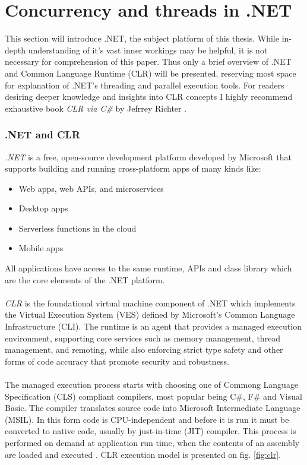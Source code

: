 \clearpage
\section{Concurrency and threads in .NET}
This section will introduce .NET, the subject platform of this thesis. While in-depth understanding of it's vast inner workings may be helpful, it is not necessary for comprehension of this paper. Thus only a brief overview of .NET and Common Language Runtime (CLR) will be presented, reserving most space for explanation of .NET's threading and parallel execution tools. For readers desiring deeper knowledge and insights into CLR concepts I highly recommend exhaustive book \emph{CLR via C\#} by Jefrrey Richter \cite{richter}.

\subsubsection{.NET and CLR}
\emph{.NET} is a free, open-source development platform developed by Microsoft that supports building and running cross-platform apps of many kinds like:
\begin{itemize}
	\item Web apps, web APIs, and microservices
	\item Desktop apps
	\item Serverless functions in the cloud
	\item Mobile apps
\end{itemize}

All applications have access to the same runtime, APIs and class library which are the core elements of the .NET platform.
\\ \\ 
\emph{CLR} is the foundational virtual machine component of .NET which implements the Virtual Execution System (VES) defined by Microsoft's Common Language Infrastructure (CLI). The runtime is an agent that provides a managed execution environment, supporting core services such as memory management, thread management, and remoting, while also enforcing strict type safety and other forms of code accuracy that promote security and robustness. \cite{IntroductionToNet}
\\ \\ 
The managed execution process starts with choosing one of Commong Language Specification (CLS) compliant compilers, most popular being C\#, F\# and Visual Basic. The compiler translates source code into Microsoft Intermediate Language (MSIL). In this form code is CPU-independent and before it is run it must be converted to native code, usually by just-in-time (JIT) compiler. This process is performed on demand at application run time, when the contents of an assembly are loaded and executed \cite{ManagedExecution}.
CLR execution model is presented on fig. \ref{fig:clr}.

